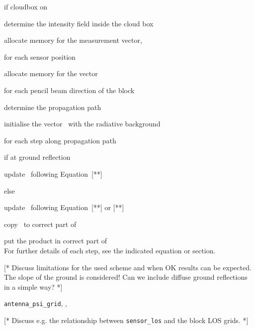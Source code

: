 if cloudbox on 

\quad determine the intensity field inside the cloud box 

allocate memory for the measurement vector, \MsrVct 

for each sensor position 

\quad allocate memory for the vector 

\quad for each pencil beam direction of the block 

\quad\quad determine the propagation path

\quad\quad initialise the vector \MpiVct\ with the radiative background

\quad\quad for each step along propagation path

\quad\quad\quad if at ground reflection

\quad\quad\quad\quad update \MpiVct\ following Equation~[**]

\quad\quad\quad else

\quad\quad\quad\quad update \MpiVct\ following Equation~[**] or [**]

\quad\quad copy \MpiVct\ to correct part of 

\quad put the product  in correct part of \MsrVct \\

\noindent
For further details of each step, see the indicated equation or section.


\label{sec:fm_defs:ppaths}


\label{sec:fm_defs:solverte}


\label{sec:fm_defs:groundrefl}

[* Discuss limitations for the used scheme and when OK results can be
expected. The slope of the ground is considered! Can we include
diffuse ground reflections in a simple way? *]



\label{sec:fm_defs:sensor2}

\verb|antenna_psi_grid|, , 


\label{sec:fm_defs:howtomeasseq}

[* Discuss e.g. the relationship between \verb|sensor_los| and the block LOS grids. *]


